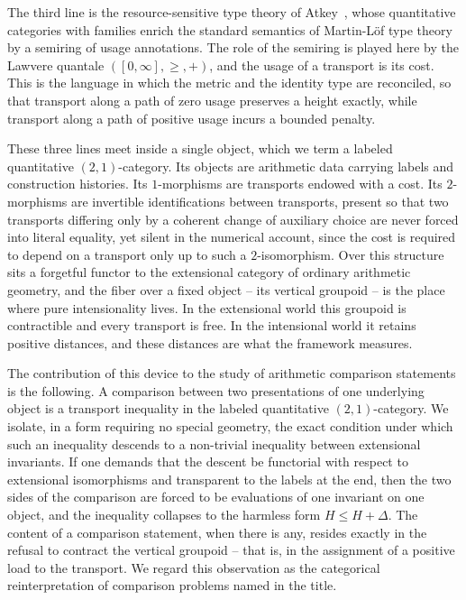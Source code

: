 \documentclass[10pt, reqno]{amsart}
\theoremstyle{plain}
\theoremstyle{definition}
\theoremstyle{plain}
\begin{document}
The third line is the resource-sensitive type theory of Atkey~\cite{Atkey2018}, whose quantitative categories with families enrich the standard semantics of Martin-L\"of type theory by a semiring of usage annotations. The role of the semiring is played here by the Lawvere quantale $([0,\infty],\ge,+)$, and the usage of a transport is its cost. This is the language in which the metric and the identity type are reconciled, so that transport along a path of zero usage preserves a height exactly, while transport along a path of positive usage incurs a bounded penalty.

These three lines meet inside a single object, which we term a labeled quantitative $(2,1)$-category. Its objects are arithmetic data carrying labels and construction histories. Its $1$-morphisms are transports endowed with a cost. Its $2$-morphisms are invertible identifications between transports, present so that two transports differing only by a coherent change of auxiliary choice are never forced into literal equality, yet silent in the numerical account, since the cost is required to depend on a transport only up to such a $2$-isomorphism. Over this structure sits a forgetful functor to the extensional category of ordinary arithmetic geometry, and the fiber over a fixed object -- its vertical groupoid -- is the place where pure intensionality lives. In the extensional world this groupoid is contractible and every transport is free. In the intensional world it retains positive distances, and these distances are what the framework measures.

The contribution of this device to the study of arithmetic comparison statements is the following. A comparison between two presentations of one underlying object is a transport inequality in the labeled quantitative $(2,1)$-category. We isolate, in a form requiring no special geometry, the exact condition under which such an inequality descends to a non-trivial inequality between extensional invariants. If one demands that the descent be functorial with respect to extensional isomorphisms and transparent to the labels at the end, then the two sides of the comparison are forced to be evaluations of one invariant on one object, and the inequality collapses to the harmless form $H \le H + \Delta$. The content of a comparison statement, when there is any, resides exactly in the refusal to contract the vertical groupoid -- that is, in the assignment of a positive load to the transport. We regard this observation as the categorical reinterpretation of comparison problems named in the title.
\end{document}
